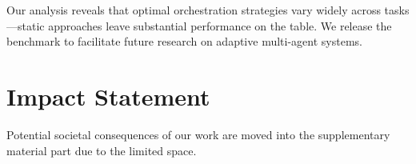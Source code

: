\documentclass{article}
\theoremstyle{plain}
\theoremstyle{definition}
\theoremstyle{remark}
\begin{document}
Our analysis reveals that optimal orchestration strategies vary widely across tasks---static approaches leave substantial performance on the table. We release the \mars{} benchmark to facilitate future research on adaptive multi-agent systems.
\section*{Impact Statement}
%
Potential societal consequences of our work are moved into the supplementary material part due to the limited space.
%
\end{document}
